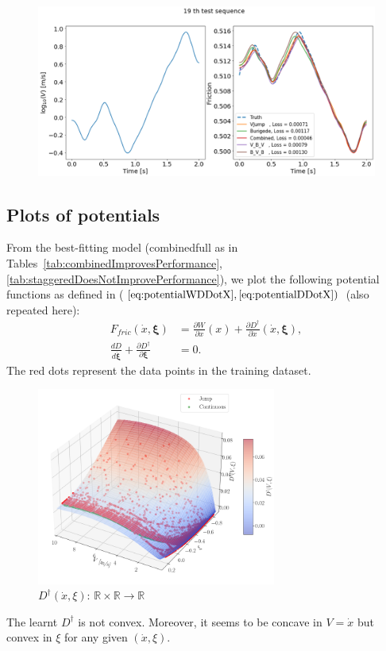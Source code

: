 \begin{figure}[H]
    \centering
    \includegraphics[width=1.0\textwidth]{./images/Trial0112_Burigede19.png}
\end{figure}

\newpage
\subsection{Plots of potentials}
From the best-fitting model (combined\textunderscore full as in Tables~\ref{tab:combinedImprovesPerformance}, \ref{tab:staggeredDoesNotImprovePerformance}), 
we plot the following potential functions as defined in ($\ref{eq:potentialWDDotX}, \ref{eq:potentialDDotX})$ (also repeated here):
\begin{align*}
    F_{fric}(\dot{x}, \boldsymbol{\xi}) &= \frac{\partial W}{\partial x}(x) + \frac{\partial D^\dagger}{\partial \dot{x}}(\dot{x}, \bm{\xi}),\\
    \frac{d D}{d \dot{\boldsymbol{\xi}}} + \frac{\partial D^\dagger}{\partial \boldsymbol{\xi}} &= 0.
\end{align*}
The red dots represent the data points in the training dataset. 

\begin{figure}[H]
    \centering
    \includegraphics[width=0.7\textwidth]{images/Trial0216_combined_800_D_dagger_normal.png}
    \caption{$D^\dagger(\dot{x}, \xi)$: $\mathbb{R}\times\mathbb{R}\rightarrow \mathbb{R}$}
    \label{fig:DDaggerPlot}
\end{figure}
The learnt $D^\dagger$ is not convex. 
Moreover, 
it seems to be concave in $V=\dot{x}$ but convex in $\xi$ for any given $(\dot{x}, \xi)$. 

